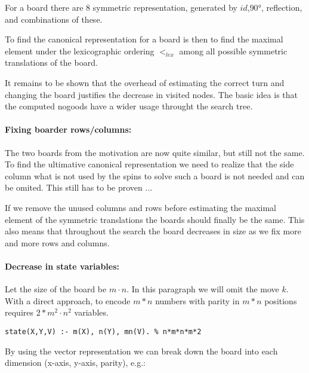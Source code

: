 \documentclass[]{llncs}
\newcommand{\spintable}[9]{
\node [matrix,ampersand replacement=\&,nodes={minimum size=4mm}]%
    {
    \node {#1}; \& \node{#2}; \& \node {#3}; \\
    \node {#4}; \& \node{#5}; \& \node {#6}; \\
    \node {#7}; \& \node{#8}; \& \node {#9}; \\
    };
}
\begin{document}
For a board there are 8 symmetric representation, generated by $id$,$90°$, reflection, and combinations of these. 

To find the canonical representation for a board is then to find the maximal element under the lexicographic ordering
$<_{lex}$ among all possible symmetric translations of the board.

It remains to be shown that the overhead of estimating the correct turn and changing the board justifies the decrease in
visited nodes. The basic idea is that the computed nogoods have a wider usage throught the search tree.

\paragraph{Fixing boarder rows/columns: }
The two boards from the motivation are now quite similar, but still not the same. To find the ultimative canonical
representation we need to realize that the side column what is not used by the spins to solve such a board is not needed
and can be omited. This still has to be proven ...

If we remove the unused columns and rows before estimating the maximal element of the symmetric translations the boards
should finally be the same. This also means that throughout the search the board decreases in size as we fix more and
more rows and columns. 


\paragraph{Decrease in state variables: }
Let the size of the board be $m\cdot n$. In this paragraph we will omit the move $k$. With a direct approach, to encode $m*n$ numbers with parity in $m*n$ positions requires $2*m^2\cdot n^2$ variables.
\begin{verbatim}
state(X,Y,V) :- m(X), n(Y), mn(V). % n*m*n*m*2
\end{verbatim}
By using the vector representation we can break down the board into each dimension (x-axis, y-axis, parity), e.g.: 

\end{document}
